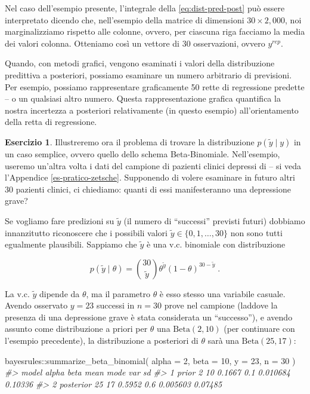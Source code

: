 \documentclass[
  11pt,
]{krantz}
\makeatletter
\newenvironment{Shaded}{\begin{snugshade}}{\end{snugshade}}
\newcommand{\AttributeTok}[1]{\textcolor[rgb]{0.61,0.61,0.61}{#1}}
\newcommand{\CommentTok}[1]{\textcolor[rgb]{0.37,0.37,0.37}{\textit{#1}}}
\newcommand{\DecValTok}[1]{\textcolor[rgb]{0.06,0.06,0.06}{#1}}
\newcommand{\FunctionTok}[1]{\textcolor[rgb]{0,0,0}{#1}}
\newcommand{\NormalTok}[1]{#1}
\newcommand{\SpecialCharTok}[1]{\textcolor[rgb]{0,0,0}{#1}}
\newenvironment{kframe}{%
\medskip{}
\setlength{\fboxsep}{.8em}
 \def\at@end@of@kframe{}%
 \ifinner\ifhmode%
  \def\at@end@of@kframe{\end{minipage}}%
  \begin{minipage}{\columnwidth}%
 \fi\fi%
 \def\FrameCommand##1{\hskip\@totalleftmargin \hskip-\fboxsep
 \colorbox{shadecolor}{##1}\hskip-\fboxsep
     \hskip-\linewidth \hskip-\@totalleftmargin \hskip\columnwidth}%
 \MakeFramed {\advance\hsize-\width
   \@totalleftmargin\z@ \linewidth\hsize
   \@setminipage}}%
 {\par\unskip\endMakeFramed%
 \at@end@of@kframe}
\renewenvironment{Shaded}{\begin{kframe}}{\end{kframe}}
\theoremstyle{definition}
\theoremstyle{definition}
\theoremstyle{definition}
\newtheorem{exercise}{Esercizio}[chapter]
\theoremstyle{definition}
\theoremstyle{remark}
\makeatother
\begin{document}
Nel caso dell'esempio presente, l'integrale della \eqref{eq:dist-pred-post} può essere interpretato dicendo che, nell'esempio della matrice di dimensioni \(30 \times 2,000\), noi marginalizziamo rispetto alle colonne, ovvero, per ciascuna riga facciamo la media dei valori colonna. Otteniamo così un vettore di 30 osservazioni, ovvero \(y^{rep}\).

Quando, con metodi grafici, vengono esaminati i valori della distribuzione predittiva a posteriori, possiamo esaminare un numero arbitrario di previsioni. Per esempio, possiamo rappresentare graficamente 50 rette di regressione predette -- o un qualsiasi altro numero. Questa rappresentazione grafica quantifica la nostra incertezza a posteriori relativamente (in questo esempio) all'orientamento della retta di regressione.

\begin{exercise}
Illustreremo ora il problema di trovare la distribuzione \(p(\tilde{y} \mid y)\) in un caso semplice, ovvero quello dello schema Beta-Binomiale. Nell'esempio, useremo un'altra volta i dati del campione di pazienti clinici depressi di \citet{zetschefuture2019} -- si veda l'Appendice \ref{es-pratico-zetsche}. Supponendo di volere esaminare in futuro altri 30 pazienti clinici, ci chiediamo: quanti di essi manifesteranno una depressione grave?

Se vogliamo fare predizioni su \(\tilde{y}\) (il numero di ``successi'' previsti futuri) dobbiamo innanzitutto riconoscere che i possibili valori \(\tilde{y} \in \{0, 1, \dots, 30\}\) non sono tutti egualmente plausibili. Sappiamo che \(\tilde{y}\) è una v.c. binomiale con distribuzione

\begin{equation}
p(\tilde{y}\mid \theta) = \binom{30}{\tilde{y}} \theta^{\tilde{y}}(1-\theta)^{30 - \tilde{y}} \; .
\label{eq:post-yprime}
\end{equation}

La v.c. \(\tilde{y}\) dipende da \(\theta\), ma il parametro \(\theta\) è esso stesso una variabile casuale. Avendo osservato \(y = 23\) successi in \(n = 30\) prove nel campione (laddove la presenza di una depressione grave è stata considerata un ``successo''), e avendo assunto come distribuzione a priori per \(\theta\) una \(\mbox{Beta}(2, 10)\) (per continuare con l'esempio precedente), la distribuzione a posteriori di \(\theta\) sarà una \(\mbox{Beta}(25, 17)\):

\begin{Shaded}
\begin{Highlighting}[]
\NormalTok{bayesrules}\SpecialCharTok{::}\FunctionTok{summarize\_beta\_binomial}\NormalTok{(}
  \AttributeTok{alpha =} \DecValTok{2}\NormalTok{, }\AttributeTok{beta =} \DecValTok{10}\NormalTok{, }\AttributeTok{y =} \DecValTok{23}\NormalTok{, }\AttributeTok{n =} \DecValTok{30}
\NormalTok{)}
\CommentTok{\#\textgreater{}       model alpha beta   mean mode      var      sd}
\CommentTok{\#\textgreater{} 1     prior     2   10 0.1667  0.1 0.010684 0.10336}
\CommentTok{\#\textgreater{} 2 posterior    25   17 0.5952  0.6 0.005603 0.07485}
\end{Highlighting}
\end{Shaded}


\end{exercise}
\end{document}

